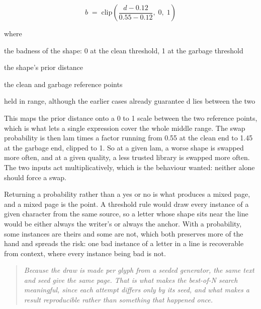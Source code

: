 
\begin{equation}
b \;=\; \mathrm{clip}\!\left( \frac{d - 0.12}{0.55 - 0.12},\; 0,\; 1 \right)
\end{equation}

\noindent where
\begin{description}[leftmargin=2.4em,style=nextline,font=\normalfont\ttfamily]\setlength\itemsep{1pt}
  \item[{$b$}] \normalfont the badness of the shape: 0 at the clean threshold, 1 at the garbage threshold
  \item[{$d$}] \normalfont the shape's prior distance
  \item[{$0.12,\;0.55$}] \normalfont the clean and garbage reference points
  \item[{$\mathrm{clip}(\cdot,0,1)$}] \normalfont held in range, although the earlier cases already guarantee d lies between the two
\end{description}
This maps the prior distance onto a 0 to 1 scale between the two reference points, which is what lets a single expression cover the whole middle range. The swap probability is then lam times a factor running from 0.55 at the clean end to 1.45 at the garbage end, clipped to 1. So at a given lam, a worse shape is swapped more often, and at a given quality, a less trusted library is swapped more often. The two inputs act multiplicatively, which is the behaviour wanted: neither alone should force a swap.


Returning a probability rather than a yes or no is what produces a mixed page, and a mixed page is the point. A threshold rule would draw every instance of a given character from the same source, so a letter whose shape sits near the line would be either always the writer's or always the anchor. With a probability, some instances are theirs and some are not, which both preserves more of the hand and spreads the risk: one bad instance of a letter in a line is recoverable from context, where every instance being bad is not.


\begin{quote}\small\itshape Because the draw is made per glyph from a seeded generator, the same text and seed give the same page. That is what makes the best-of-N search meaningful, since each attempt differs only by its seed, and what makes a result reproducible rather than something that happened once.\end{quote}


